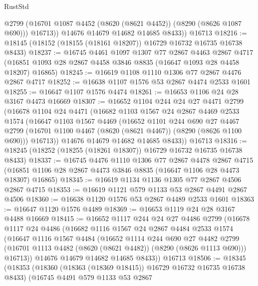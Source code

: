 \begin{lexlean}{RustStd}
\begin{coremodule}
            @2799
            (@16701 @1087 @4452 (@8620 (@8621 @4452)) (@8290 (@8626 @1087 @690)))
            @16713))
        @14676
        @14679
        @14682
        @14685
        @8433))
    @16713
@18216 := @18145 (@18152 (@18155 (@18161 @18207)) @16729 @16732 @16735 @16738 @8433)
@18237 := @16745
    @4461
    @1097
    @1307
    @77
    @2867
    @4463
    @2867
    @4717
    (@16851 @1093 @28 @2867 @4458 @3846 @8835 (@16647 @1093 @28 @4458 @18207) @16865)
@18245 := @16619 @1108 @1110 @1306 @77 @2867 @4476 @2867 @4717
@18252 := @16638 @1107 @1576 @53 @2867 @4474 @2533 @1601
@18255 := @16647 @1107 @1576 @4474
@18261 := @16653 @1106 @24 @28 @3167 @4473 @16669
@18307 := @16652
    @1104
    @244
    @24
    @27
    @4471
    @2799
    (@16678
      @1104
      @24
      @4471
      (@16682
        @1103
        @1567
        @24
        @2867
        @4469
        @2533
        @1574
        (@16647
          @1103
          @1567
          @4469
          (@16652
            @1101
            @244
            @690
            @27
            @4467
            @2799
            (@16701 @1100 @4467 (@8620 (@8621 @4467)) (@8290 (@8626 @1100 @690)))
            @16713))
        @14676
        @14679
        @14682
        @14685
        @8433))
    @16713
@18316 := @18245 (@18252 (@18255 (@18261 @18307)) @16729 @16732 @16735 @16738 @8433)
@18337 := @16745
    @4476
    @1110
    @1306
    @77
    @2867
    @4478
    @2867
    @4715
    (@16851 @1106 @28 @2867 @4473 @3846 @8835 (@16647 @1106 @28 @4473 @18307) @16865)
@18345 := @16619 @1134 @1136 @1305 @77 @2867 @4506 @2867 @4715
@18353 := @16619 @1121 @579 @1133 @53 @2867 @4491 @2867 @4506
@18360 := @16638 @1120 @1576 @53 @2867 @4489 @2533 @1601
@18363 := @16647 @1120 @1576 @4489
@18369 := @16653 @1119 @24 @28 @3167 @4488 @16669
@18415 := @16652
    @1117
    @244
    @24
    @27
    @4486
    @2799
    (@16678
      @1117
      @24
      @4486
      (@16682
        @1116
        @1567
        @24
        @2867
        @4484
        @2533
        @1574
        (@16647
          @1116
          @1567
          @4484
          (@16652
            @1114
            @244
            @690
            @27
            @4482
            @2799
            (@16701 @1113 @4482 (@8620 (@8621 @4482)) (@8290 (@8626 @1113 @690)))
            @16713))
        @14676
        @14679
        @14682
        @14685
        @8433))
    @16713
@18506 := @18345
    (@18353
      (@18360 (@18363 (@18369 @18415)) @16729 @16732 @16735 @16738 @8433)
      (@16745
        @4491
        @579
        @1133
        @53
        @2867

\end{coremodule}
\end{lexlean}
